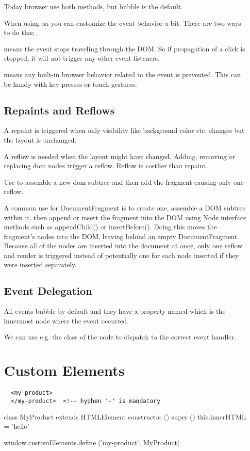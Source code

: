 Today browser use both methods, but bubble is the default.

When using on you can customize the event behavior a bit. There are two ways
to do this:

 means the event stops traveling through the DOM. So
if propagation of a click is stopped, it will not trigger any other event
listeners.

 means any built-in browser behavior related to the
event is prevented. This can be handy with key presses or touch gestures.



\subsection{Repaints and Reflows}

A repaint is triggered when only visibility like background color etc. changes
but the layout is unchanged.

A reflow is needed when the layout might have changed. Adding, removing or
replacing dom nodes trigger a reflow. Reflow is costlier than repaint.

Use  to assemble a new dom subtree and then add
the fragment causing only one reflow.


A common use for DocumentFragment is to create one, assemble a DOM subtree
within it, then append or insert the fragment into the DOM using Node
interface methods such as appendChild() or insertBefore(). Doing this moves
the fragment's nodes into the DOM, leaving behind an empty
DocumentFragment. Because all of the nodes are inserted into the document at
once, only one reflow and render is triggered instead of potentially one for
each node inserted if they were inserted separately.


\subsection{Event Delegation}

All events bubble by default and they have a property named 
which is the innermost node where the event occurred.

We can use e.g. the class  of the node to dispatch to the correct
event handler.



\section{Custom Elements}

{\small
\begin{verbatim}
  <my-product>
  </my-product>  <!-- hyphen '-' is mandatory
\end{verbatim}
}

\begin{js}
  class MyProduct extends HTMLElement {
    constructor () {
      super ()
      this.innerHTML = 'hello'
    }
  }

  window.customElements.define ('my-product', MyProduct)
\end{js}

